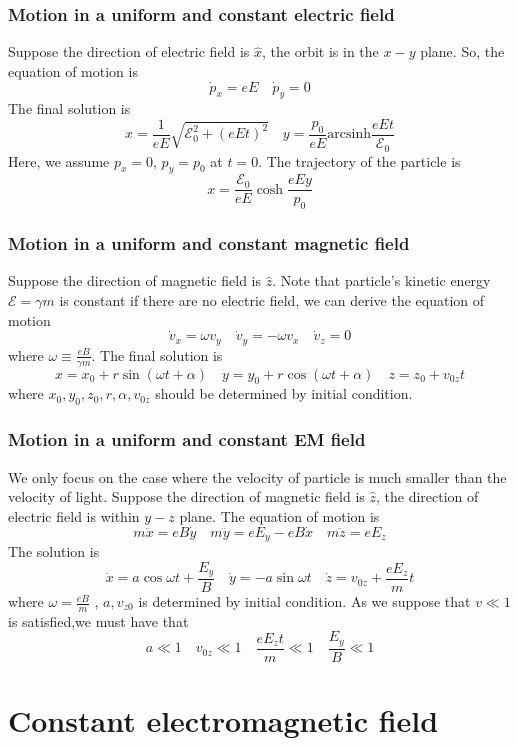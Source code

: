 \subsubsection{Motion in a uniform and constant electric field}
Suppose the direction of electric field is  $\hat{x}$, the orbit is in the $x-y$ plane. So, the equation of motion is
\[\dot{p}_x = eE \quad \dot{p}_y = 0\]
The final solution is
\[x = \frac{1}{eE}\sqrt{\mathcal{E}_0^2 + (eEt)^2} \quad y = \frac{p_0}{eE} \mathrm{arcsinh} \frac{eEt}{\mathcal{E}_0}\]
Here, we assume $p_x = 0$, $p_y=p_0$ at $t = 0$.
The trajectory of the particle is
\[x = \frac{\mathcal{E}_0}{eE}\cosh \frac{eEy}{p_0}\]

\subsubsection{Motion in a uniform and constant magnetic field}
Suppose the direction of magnetic field is $\hat{z}$. Note that particle's kinetic energy $\mathcal{E} = \gamma m$ is constant if there are no electric field, we can derive the equation of motion
\[\dot{v}_x = \omega v_y \quad \dot{v}_y = -\omega v_x \quad \dot{v}_z = 0\]
where $\omega \equiv \frac{eB}{\gamma m}$. The final solution is
\[x = x_0 + r\sin(\omega t + \alpha) \quad y = y_0 + r\cos(\omega t + \alpha) \quad z = z_0 + v_{0z}t\]
where $x_0,y_0,z_0,r,\alpha,v_{0z}$ should be determined by initial condition.

\subsubsection{Motion in a uniform and constant EM field}
We only focus on the case where the velocity of particle is much smaller than the velocity of light. 
Suppose the direction of magnetic field is $\hat{z}$, the direction of electric field is within $y-z$ plane. The equation of motion is
\[m\ddot{x} = eB\dot{y} \quad m\ddot{y} =eE_y - eB\dot{x} \quad m\ddot{z}=eE_z\]
The solution is
\[\dot{x} = a \cos \omega t + \frac{E_y}{B} \quad \dot{y} = -a\sin \omega t \quad \dot{z} = v_{0z} + \frac{eE_z}{m}t\]
where $\omega = \frac{eB}{m}$ , $a,v_{z0}$ is determined by initial condition. As we suppose that $v \ll 1$ is satisfied,we must have that
\[a \ll 1 \quad v_{0z} \ll 1 \quad \frac{eE_z t}{m} \ll 1 \quad \frac{E_y}{B} \ll 1\]

\section{Constant electromagnetic field}
